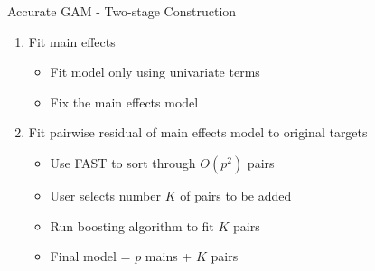 \documentclass[11pt,compress,t,notes=noshow, aspectratio=169, xcolor=table]{beamer}
\begin{document}
\begin{frame}{Accurate GAM - Two-stage Construction}
\begin{enumerate}
    \item Fit main effects
    \begin{itemize}
        \item Fit model only using univariate terms
        \item Fix the main effects model
    \end{itemize}
    \item Fit pairwise residual of main effects model to original targets
    \begin{itemize}
        \item Use FAST to sort through $O(p^2)$ pairs
        \item User selects number $K$ of pairs to be added
        \item Run boosting algorithm to fit $K$ pairs
        \item Final model = $p$ mains + $K$ pairs
    \end{itemize}
\end{enumerate}
\end{frame}
\end{document}
